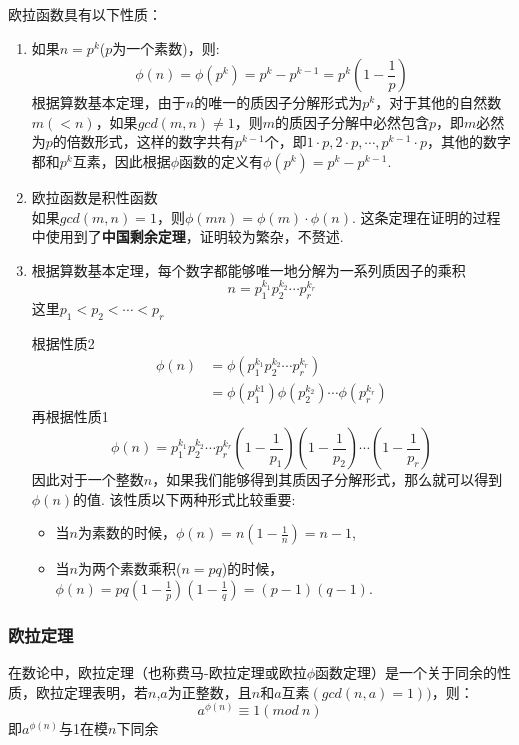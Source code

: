 \documentclass[UTF8]{ctexart}
\begin{document}
欧拉函数具有以下性质：
\begin{enumerate}
	\item 如果$n = p^k$($p$为一个素数)，则:
	      \[
		      \phi(n) = \phi(p^k) = p^k - p^{k-1} = p^k(1 - \frac{1}{p})
	      \]
	      根据算数基本定理，由于$n$的唯一的质因子分解形式为$p^k$，对于其他的自然数$m(< n)$，如果$gcd(m,n) \neq 1$，则$m$的质因子分解中必然包含$p$，即$m$必然为$p$的倍数形式，这样的数字共有$p^{k-1}$个，即$1 \cdot p, 2 \cdot p, \cdots,$$ p^{k-1} \cdot p$，其他的数字都和$p^k$互素，因此根据$\phi$函数的定义有$\phi(p^k) = p^k - p^{k-1}$.
	\item 欧拉函数是积性函数\\
	      如果$gcd(m,n) = 1$，则$\phi(mn) = \phi(m) \cdot \phi(n)$.
	      这条定理在证明的过程中使用到了\textbf{中国剩余定理}，证明较为繁杂，不赘述.
	\item 根据算数基本定理，每个数字都能够唯一地分解为一系列质因子的乘积
	      \[
		      n = p_1^{k_1}p_2^{k_2} \cdots p_r^{k_r}
	      \]
	      这里$p_1 < p_2 < \cdots < p_r$

	      根据性质2
	      \begin{align*}
		      \phi(n) & = \phi(p_1^{k_1}p_2^{k_2} \cdots p_r^{k_r})            \\
		              & = \phi(p_1^{k1})\phi(p_2^{k_2}) \cdots \phi(p_r^{k_r})
	      \end{align*}
	      再根据性质1
	      \[
		      \phi(n) = p_1^{k_1}p_2^{k_2} \cdots p_r^{k_r}(1 - \frac{1}{p_1})(1-\frac{1}{p_2}) \cdots (1 - \frac{1}{p_r})
	      \]
	      因此对于一个整数$n$，如果我们能够得到其质因子分解形式，那么就可以得到$\phi(n)$的值.
	      该性质以下两种形式比较重要:
	      \begin{itemize}
		      \item 当$n$为素数的时候，$\phi(n) = n(1 - \frac{1}{n}) = n - 1$,
		      \item 当$n$为两个素数乘积($n = p q$)的时候，$\phi(n) = pq(1 - \frac{1}{p})(1- \frac{1}{q}) = (p-1)(q-1)$.
	      \end{itemize}
\end{enumerate}

\subsubsection{欧拉定理}
在数论中，欧拉定理（也称费马-欧拉定理或欧拉$\phi$函数定理）是一个关于同余的性质，欧拉定理表明，若$n$,$a$为正整数，且$n$和$a$互素$(gcd(n,a) = 1))$，则：
\[
	a^{\phi(n)} \equiv 1 (mod \ n)
\]
即$a^{\phi(n)}$与1在模$n$下同余
\end{document}
